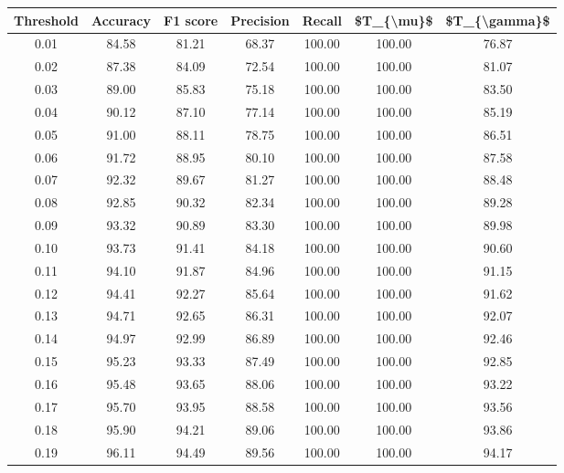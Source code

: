 \begin{tabular}{|c|c|c|c|c|c|c|}
\hline
 Threshold &  Accuracy &  F1 score &  Precision &  Recall &  \$T\_\{\textbackslash mu\}\$ &  \$T\_\{\textbackslash gamma\}\$ \\
\hline
      0.01 &     84.58 &     81.21 &      68.37 &  100.00 &     100.00 &         76.87 \\
      0.02 &     87.38 &     84.09 &      72.54 &  100.00 &     100.00 &         81.07 \\
      0.03 &     89.00 &     85.83 &      75.18 &  100.00 &     100.00 &         83.50 \\
      0.04 &     90.12 &     87.10 &      77.14 &  100.00 &     100.00 &         85.19 \\
      0.05 &     91.00 &     88.11 &      78.75 &  100.00 &     100.00 &         86.51 \\
      0.06 &     91.72 &     88.95 &      80.10 &  100.00 &     100.00 &         87.58 \\
      0.07 &     92.32 &     89.67 &      81.27 &  100.00 &     100.00 &         88.48 \\
      0.08 &     92.85 &     90.32 &      82.34 &  100.00 &     100.00 &         89.28 \\
      0.09 &     93.32 &     90.89 &      83.30 &  100.00 &     100.00 &         89.98 \\
      0.10 &     93.73 &     91.41 &      84.18 &  100.00 &     100.00 &         90.60 \\
      0.11 &     94.10 &     91.87 &      84.96 &  100.00 &     100.00 &         91.15 \\
      0.12 &     94.41 &     92.27 &      85.64 &  100.00 &     100.00 &         91.62 \\
      0.13 &     94.71 &     92.65 &      86.31 &  100.00 &     100.00 &         92.07 \\
      0.14 &     94.97 &     92.99 &      86.89 &  100.00 &     100.00 &         92.46 \\
      0.15 &     95.23 &     93.33 &      87.49 &  100.00 &     100.00 &         92.85 \\
      0.16 &     95.48 &     93.65 &      88.06 &  100.00 &     100.00 &         93.22 \\
      0.17 &     95.70 &     93.95 &      88.58 &  100.00 &     100.00 &         93.56 \\
      0.18 &     95.90 &     94.21 &      89.06 &  100.00 &     100.00 &         93.86 \\
      0.19 &     96.11 &     94.49 &      89.56 &  100.00 &     100.00 &         94.17 \\

\end{tabular}
